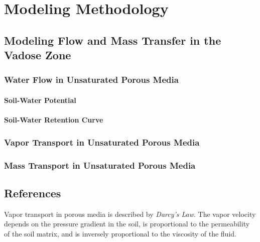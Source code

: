 \documentclass[../main.tex]{subfiles}
\begin{document}
\chapter{Modeling Methodology}

\section{Modeling Flow and Mass Transfer in the Vadose Zone}

\subsection{Water Flow in Unsaturated Porous Media}

\subsubsection{Soil-Water Potential }

\subsubsection{Soil-Water Retention Curve}

\subsection{Vapor Transport in Unsaturated Porous Media}

\subsection{Mass Transport in Unsaturated Porous Media}


\section{References}


Vapor transport in porous media is described by \textit{Darcy's Law}.
The vapor velocity depends on the pressure gradient in the soil, is proportional to the permeability of the soil matrix, and is inversely proportional to the viscosity of the fluid.
\end{document}
